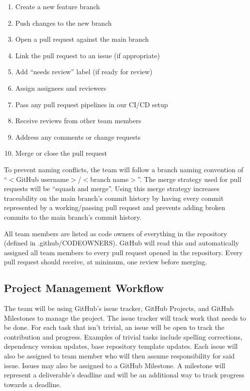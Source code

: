 \documentclass{article}
\begin{document}
\begin{enumerate}
  \item Create a new feature branch
  \item Push changes to the new branch
  \item Open a pull request against the main branch
  \item Link the pull request to an issue (if appropriate)
  \item Add ``needs review'' label (if ready for review)
  \item Assign assignees and reviewers
  \item Pass any pull request pipelines in our CI/CD setup
  \item Receive reviews from other team members
  \item Address any comments or change requests
  \item Merge or close the pull request
\end{enumerate}

To prevent naming conflicts, the team will follow a branch naming convention of
``$<$GitHub username$>$/$<$branch name$>$''. The merge strategy used for pull requests will be
``squash and merge''. Using this merge strategy increases traceability on the main branch's commit
history by having every commit represented by a working/passing pull request and prevents adding
broken commits to the main branch's commit history.

All team members are listed as code owners of everything in the repository (defined in
.github/CODEOWNERS). GitHub will read this and automatically assigned all team members to every pull
request opened in the repository. Every pull request should receive, at minimum, one review before
merging.

\subsection{Project Management Workflow}

The team will be using GitHub's issue tracker, GitHub Projects, and GitHub Milestones to manage the
project. The issue tracker will track work that needs to be done. For each task that isn't trivial,
an issue will be open to track the contribution and progress. Examples of trivial tasks include
spelling corrections, dependency version updates, base repository template updates. Each issue will
also be assigned to team member who will then assume responsibility for said issue. Issues may also
be assigned to a GitHub Milestone. A milestone will represent a deliverable's deadline and will be
an additional way to track progress towards a deadline.
\end{document}
